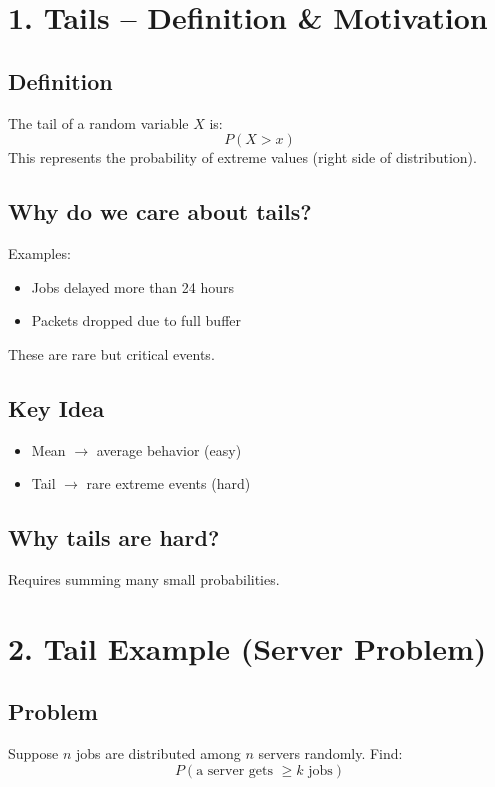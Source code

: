 \documentclass{article}
\begin{document}
\section*{1. Tails -- Definition \& Motivation}

\subsection*{Definition}
The tail of a random variable $X$ is:
\[
P(X > x)
\]
This represents the probability of extreme values (right side of distribution).

\subsection*{Why do we care about tails?}
Examples:
\begin{itemize}
    \item Jobs delayed more than 24 hours
    \item Packets dropped due to full buffer
\end{itemize}

These are rare but critical events.

\subsection*{Key Idea}
\begin{itemize}
    \item Mean $\rightarrow$ average behavior (easy)
    \item Tail $\rightarrow$ rare extreme events (hard)
\end{itemize}

\subsection*{Why tails are hard?}
Requires summing many small probabilities.

\section*{2. Tail Example (Server Problem)}

\subsection*{Problem}
Suppose $n$ jobs are distributed among $n$ servers randomly. Find:
\[
P(\text{a server gets } \ge k \text{ jobs})
\]
\end{document}
